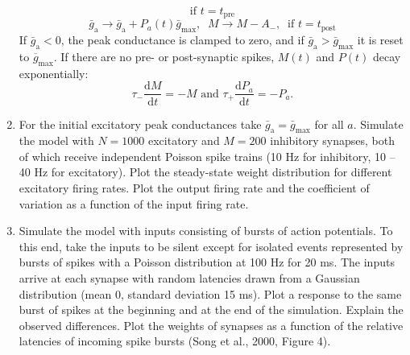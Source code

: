 \documentclass[12pt]{article}
\newcommand{\tderiv}[1]{\frac{\mathrm{d}#1}{\mathrm{d}t}}
\begin{document}
\begin{enumerate}
\begin{equation}
            \text{if } t =
            t_\mathrm{pre}
        \end{equation}
        \begin{equation}
            \bar{g}_\mathrm{a} \rightarrow
            \bar{g}_\mathrm{a}+
            P_a(t)\bar{g}_\mathrm{max},\; \;
            M \rightarrow M - A_-, \; \;
            \text{if } t =
            t_\mathrm{post}
        \end{equation}
        If $\bar{g}_\mathrm{a}<0$, the peak conductance is clamped to zero, and
        if $\bar{g}_\mathrm{a}>\bar{g}_\mathrm{max}$ it is reset to
        $\overline{g}_\mathrm{max}$. If there are no pre- or
        post-synaptic spikes, $M(t)$ and $P(t)$ decay exponentially:
        \begin{equation}
            \tau_{-}\tderiv{M}=-M \text{ and } \tau_{+}\tderiv{P_a}=-P_a.
            \label{eq:stdp}
        \end{equation}


    \item For the initial excitatory peak conductances take
        $\bar{g}_\mathrm{a}=\bar{g}_\mathrm{max}$ for all $a$. Simulate the
        model with $N=1000$ excitatory and $M=200$ inhibitory synapses,
        both of which receive independent
        Poisson spike trains (10 Hz for inhibitory, 10 -- 40 Hz
        for excitatory). Plot the steady-state weight distribution for
        different excitatory firing rates. Plot the output firing rate
        and the coefficient of variation as a function of the input firing
        rate.

    \item Simulate the model with inputs consisting of bursts of
        action potentials. To this end, take the inputs to be silent
        except for isolated events represented by bursts of spikes
        with a Poisson distribution at 100 Hz for 20 ms. The inputs
        arrive at each synapse with random latencies drawn from a
        Gaussian distribution (mean 0, standard deviation 15 ms). Plot
        a response to the same burst of spikes at the beginning and
        at the end of the simulation. Explain the observed differences.
        Plot the weights of synapses as a function of the relative
        latencies of incoming spike bursts (Song et al., 2000, Figure 4).
\end{enumerate}
\end{document}

